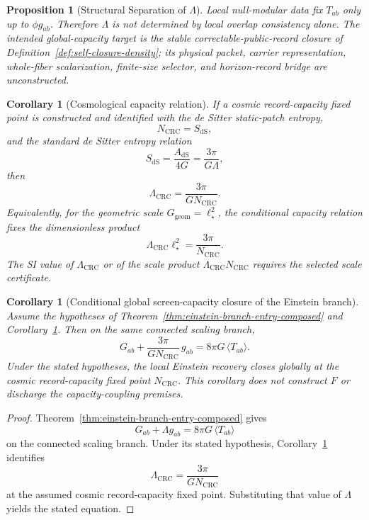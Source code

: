\documentclass[11pt]{article}
\newtheorem{corollary}[theorem]{Corollary}
\newtheorem{proposition}[theorem]{Proposition}
\begin{document}
\begin{proposition}[Structural Separation of $\Lambda$]\label{prop:lambda}
Local null-modular data fix $T_{ab}$ only up to $\phi g_{ab}$. Therefore $\Lambda$ is not determined by local overlap consistency alone. The intended global-capacity target is the stable correctable-public-record closure of Definition~\ref{def:self-closure-density}; its physical packet, carrier representation, whole-fiber scalarization, finite-size selector, and horizon-record bridge are unconstructed.
\end{proposition}

\begin{corollary}[Cosmological capacity relation]\label{cor:lambda}
If a cosmic record-capacity fixed point is constructed and identified with the de Sitter static-patch
entropy,
\[
N_{\mathrm{CRC}}=S_{\mathrm{dS}},
\]
\noindent and the standard de Sitter entropy relation
\[
S_{\mathrm{dS}}=\frac{A_{\mathrm{dS}}}{4G}=\frac{3\pi}{G\Lambda},
\]
then
\[
\Lambda_{\mathrm{CRC}}=\frac{3\pi}{G N_{\mathrm{CRC}}}.
\]
Equivalently, for the geometric scale \(G_{\mathrm{geom}}=\ell_\star^2\), the conditional capacity relation fixes
the dimensionless product
\[
\Lambda_{\mathrm{CRC}}\ell_\star^2=\frac{3\pi}{N_{\mathrm{CRC}}}.
\]
The SI value of \(\Lambda_{\mathrm{CRC}}\) or of the scale product
\(\Lambda_{\mathrm{CRC}}N_{\mathrm{CRC}}\) requires the selected scale certificate.
\end{corollary}

\begin{corollary}[Conditional global screen-capacity closure of the Einstein branch]\label{cor:lambda-global}
Assume the hypotheses of
Theorem~\ref{thm:einstein-branch-entry-composed} and
Corollary~\ref{cor:lambda}. Then on the same connected scaling branch,
\[
G_{ab}+\frac{3\pi}{G N_{\mathrm{CRC}}}\,g_{ab}=8\pi G\,\langle T_{ab}\rangle.
\]
Under the stated hypotheses, the local Einstein recovery closes globally at the cosmic
record-capacity fixed point \(N_{\mathrm{CRC}}\).  This corollary does not construct \(F\) or
discharge the capacity-coupling premises.
\end{corollary}

\begin{proof}
Theorem~\ref{thm:einstein-branch-entry-composed} gives
\[
G_{ab}+\Lambda g_{ab}=8\pi G\,\langle T_{ab}\rangle
\]
on the connected scaling branch. Under its stated hypothesis, Corollary~\ref{cor:lambda} identifies
\[
\Lambda_{\mathrm{CRC}}=\frac{3\pi}{G N_{\mathrm{CRC}}}
\]
at the assumed cosmic record-capacity fixed point. Substituting that value of \(\Lambda\) yields the stated equation.
\end{proof}
\end{document}
